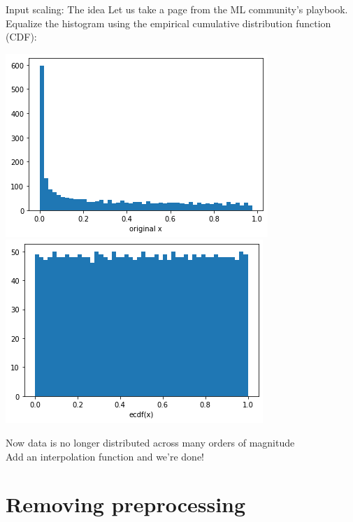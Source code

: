 \documentclass[aspectratio=169,11pt]{beamer}
\newcommand{\nn}{\vspace*{1em}}
\begin{document}
\begin{frame}[t]{Input scaling: The idea}
  Let us take a page from the ML community's playbook.\\
  Equalize the histogram using the empirical cumulative distribution function (CDF):
  \begin{center}
    \includegraphics[height=0.4\textheight]{figures/default_xgrid.png} \hspace*{1cm}
    \includegraphics[height=0.4\textheight]{figures/ecdf_xgrid.png}
  \end{center}
  Now data is no longer distributed across many orders of magnitude \\ \nn
  Add an interpolation function and we're done!
\end{frame}


\section{Removing preprocessing}
\end{document}
